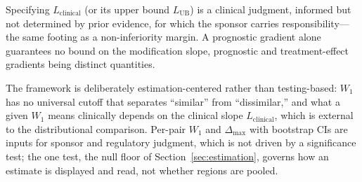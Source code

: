 \documentclass[AMA,Times1COL]{WileyNJDv5}
\begin{document}
Specifying $L_{\text{clinical}}$ (or its upper bound $L_{\text{UB}}$) is a clinical judgment, informed but not determined by prior evidence, for which the sponsor carries responsibility---the same footing as a non-inferiority margin. A prognostic gradient alone guarantees no bound on the modification slope, prognostic and treatment-effect gradients being distinct quantities.\cite{ballman2015,kent2020}

The framework is deliberately estimation-centered rather than testing-based: $W_1$ has no universal cutoff that separates ``similar'' from ``dissimilar,'' and what a given $W_1$ means clinically depends on the clinical slope $L_{\text{clinical}}$, which is external to the distributional comparison. Per-pair $W_1$ and $\Delta_{\max}$ with bootstrap CIs are inputs for sponsor and regulatory judgment, which is not driven by a significance test;\cite{wasserstein2016} the one test, the null floor of Section~\ref{sec:estimation}, governs how an estimate is displayed and read, not whether regions are pooled.
\end{document}

